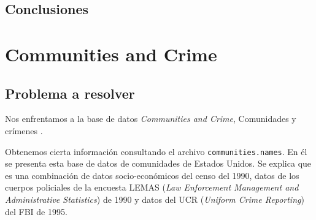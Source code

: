 \documentclass[a4paper, 20pt]{article}
\begin{document}
\subsection{Conclusiones}
\newpage


\section{Communities and Crime}

\subsection{Problema a resolver}

Nos enfrentamos a la base de datos \textit{Communities and Crime}, Comunidades y crímenes \cite{com_uci}.

Obtenemos cierta información consultando el archivo \texttt{communities.names}. En él se presenta esta base de datos de comunidades de Estados Unidos. Se explica que es una combinación de datos socio-económicos del censo del 1990, datos de los cuerpos policiales de la encuesta LEMAS (\textit{Law Enforcement Management and Administrative Statistics}) de 1990 y datos del UCR (\textit{Uniform Crime Reporting}) del FBI de 1995.
\end{document}
